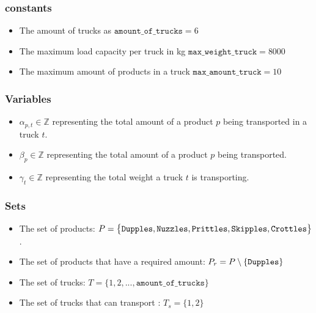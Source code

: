         \subsubsection{constants}
            \begin{itemize}
                \item
                    The amount of trucks as
                    $\texttt{amount\_of\_trucks} = 6$
                \item 
                    The maximum load capacity per truck in kg
                    $\texttt{max\_weight\_truck} = 8000$
                \item
                    The maximum amount of products in a truck
                    $\texttt{max\_amount\_truck} = 10$
            \end{itemize}

        \subsubsection{Variables}
            \begin{itemize}
                \item
                    $\alpha_{p,t} \in \mathbb{Z}$ representing the total amount
                    of a product $p$ being transported in a truck $t$.
                \item
                    $\beta_{p} \in \mathbb{Z}$ representing the total amount of
                    a product $p$ being transported.
                \item
                    $\gamma_{t} \in \mathbb{Z}$ representing the total weight a
                    truck $t$ is transporting.
            \end{itemize}

        \subsubsection{Sets}
            \begin{itemize}
                \item 
                    The set of products: $P = \big\{
                        \texttt{Dupples},
                        \texttt{Nuzzles},
                        \texttt{Prittles},
                        \texttt{Skipples},
                        \texttt{Crottles}
                    \big\}$.
                \item 
                    The set of products that have a required amount: 
                    $P_r = P \setminus \{ \texttt{Dupples} \}$
                \item
                    The set of trucks: $T = \big\{
                        1, 2, ..., \texttt{amount\_of\_trucks}
                    \big\}$
                \item
                    The set of trucks that can transport \Skipples:
                    $T_s = \big\{ 1, 2 \big\}$
            \end{itemize}

